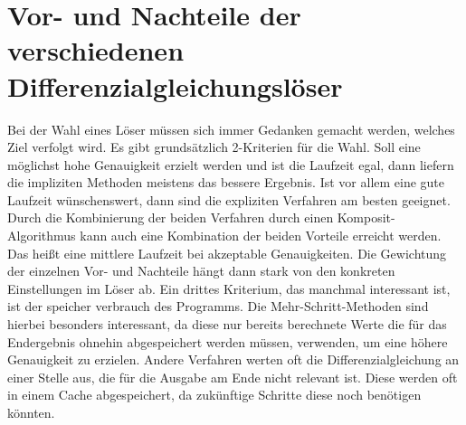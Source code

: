 
\section{Vor- und Nachteile der verschiedenen Differenzialgleichungslöser} \label{sec:chose_solver}
Bei der Wahl eines Löser müssen sich immer Gedanken gemacht werden, welches Ziel verfolgt wird.
Es gibt grundsätzlich 2-Kriterien für die Wahl.
Soll eine möglichst hohe Genauigkeit erzielt werden und ist die Laufzeit egal, 
dann liefern die impliziten Methoden meistens das bessere Ergebnis.
Ist vor allem eine gute Laufzeit wünschenswert, dann sind die expliziten Verfahren am besten 
geeignet.
Durch die Kombinierung der beiden Verfahren durch einen Komposit-Algorithmus kann auch eine Kombination
der beiden Vorteile erreicht werden.
Das heißt eine mittlere Laufzeit bei akzeptable Genauigkeiten.
Die Gewichtung der einzelnen Vor- und Nachteile hängt dann stark von den konkreten Einstellungen 
im Löser ab.
Ein drittes Kriterium, das manchmal interessant ist, ist der speicher verbrauch des Programms.
Die Mehr-Schritt-Methoden sind hierbei besonders interessant, da diese nur bereits berechnete Werte
die für das Endergebnis ohnehin abgespeichert werden müssen, verwenden, um eine höhere Genauigkeit zu erzielen.
Andere Verfahren werten oft die Differenzialgleichung an einer Stelle aus, die für die Ausgabe am 
Ende nicht relevant ist. Diese werden oft in einem Cache abgespeichert, da zukünftige Schritte 
diese noch benötigen könnten.



